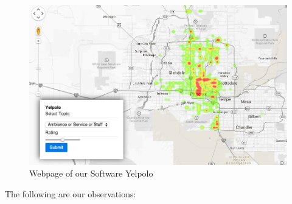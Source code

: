 \documentclass[12pt]{article} %
\begin{document}
\begin{figure}[h]
\begin{center}
\includegraphics[width=6.5in]{yelp_2.png}
\caption{Webpage of our Software Yelpolo}
\end{center}
\end{figure}

The following are our observations:
\end{document}
